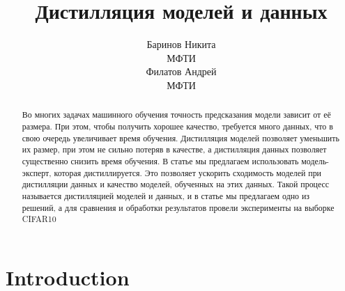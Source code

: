\documentclass[12pt]{article}
\title{Дистилляция моделей и данных}
\author{ Баринов Никита\\
	МФТИ\\
	\And
	Филатов Андрей \\
	МФТИ       
}
\date{}
\begin{document}
\maketitle

\begin{abstract}

Во многих задачах машинного обучения точность предсказания модели зависит от её размера. При этом, чтобы получить хорошее качество, требуется много данных, что в свою очередь увеличивает время обучения. Дистилляция моделей позволяет уменьшить их размер, при этом не сильно потеряв в качестве, а дистилляция данных позволяет существенно снизить время обучения. В статье мы предлагаем использовать модель-эксперт, которая дистиллируется. Это позволяет ускорить сходимость моделей при дистилляции данных и качество моделей, обученных на этих данных. Такой процесс называется дистилляцией моделей и данных, и в статье мы предлагаем одно из решений, а для сравнения и обработки результатов провели эксперименты на выборке CIFAR10







\end{abstract}



\section{Introduction}
\end{document}
